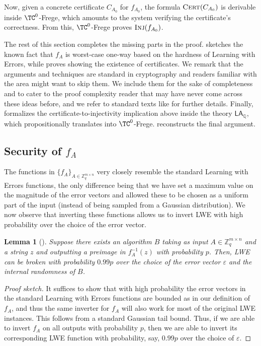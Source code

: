 \documentclass[11pt]{article}
\newcommand{\LAQ}{\mathsf{LA}_\mathbb{Q}}
\theoremstyle{definition}
\theoremstyle{plain}
\newtheorem{lemma}[definition]{Lemma}
\theoremstyle{remark}
\newcommand{\bZ}{\mathbb{Z}}
\begin{document}
Now, given a concrete certificate $C_{A_0}$ for $f_{A_0}$, the formula $\operatorname{\textsc{Cert}}(C_{A_0})$ is derivable inside $\TC^0$-Frege, which amounts to the system verifying the certificate's correctness. From this, $\TC^0$-Frege proves $\operatorname{\textsc{Inj}}(f_{A_0})$.

The rest of this section completes the missing parts in the proof.  sketches the known fact that $f_A$ is worst-case one-way based on the hardness of Learning with Errors, while  proves  showing the existence of certificates. We remark that the arguments and techniques are standard in cryptography and readers familiar with the area might want to skip them. We include them for the sake of completeness and to cater to the proof complexity reader that may have never come across these ideas before, and we refer to standard texts like \cite{Micciancio2011} for further details. Finally,  formalizes the certificate-to-injectivity implication above inside the theory $\LAQ$, which propositionally translates into $\TC^0$-Frege.  reconstructs the final argument.

\subsection{Security of $f_A$}
\label{subsec:security}

The functions in $\{ f_A\}_{A \in \bZ_q^{m \times n}}$ very closely resemble the standard Learning with Errors functions, the only difference being that we have set a maximum value on the magnitude of the error vectors and allowed these to be chosen as a uniform part of the input (instead of being sampled from a Gaussian distribution). We now observe that inverting these functions allows us to invert LWE with high probability over the choice of the error vector.

\begin{lemma}[{\cite[Section 3.2]{Micciancio2011}}]
\label{lme:security}
Suppose there exists an algorithm $B$ taking as input $A\in \bZ_q^{m \times n}$ and a string $z$ and outputting a preimage in $f^{-1}_A(z)$ with probability $p$. Then, LWE can be broken with probability $0.99p$ over the choice of the error vector $\varepsilon$ and the internal randomness of $B$.
\end{lemma}
\begin{proof}[Proof sketch]
It suffices to show that with high probability the error vectors in the standard Learning with Errors functions are bounded as in our definition of $f_A$, and thus the same inverter for $f_A$ will also work for most of the original LWE instances. This follows from a standard Gaussian tail bound. Thus, if we are able to invert $f_A$ on all outputs with probability $p$, then we are able to invert its corresponding LWE function with probability, say, $0.99p$ over the choice of $\varepsilon$.
\end{proof}
\end{document}
